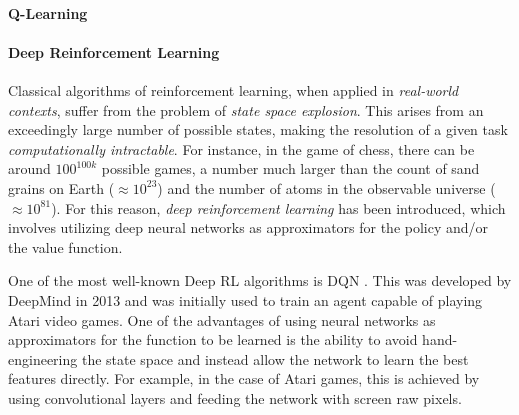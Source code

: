 \documentclass[12pt,a4paper,openright,twoside]{book}
\begin{document}
\paragraph{Q-Learning}

\paragraph{Deep Reinforcement Learning}


Classical algorithms of reinforcement learning, when applied in \emph{real-world contexts}, suffer from the problem of \emph{state space explosion}.
    This arises from an exceedingly large number of possible states, making the resolution of a given task \emph{computationally intractable}. 
    For instance, in the game of chess, there can be around $100^{100k}$ possible games, a number much larger than 
    the count of sand grains on Earth ($\approx 10^{23}$) and the number of atoms in the observable universe 
    ($\approx 10^{81}$). 
    For this reason, \emph{deep reinforcement learning} has been introduced, which involves utilizing deep neural networks
    as approximators for the policy and/or the value function.

One of the most well-known Deep RL algorithms is DQN \cite{dqn}. This was developed by DeepMind in 2013 and was initially
    used to train an agent capable of playing Atari video games. One of the advantages of using neural networks as 
    approximators for the function to be learned is the ability to avoid hand-engineering the state space and instead 
    allow the network to learn the best features directly. For example, in the case of Atari games, this is achieved 
    by using convolutional layers and feeding the network with screen raw pixels.

    
\end{document}
